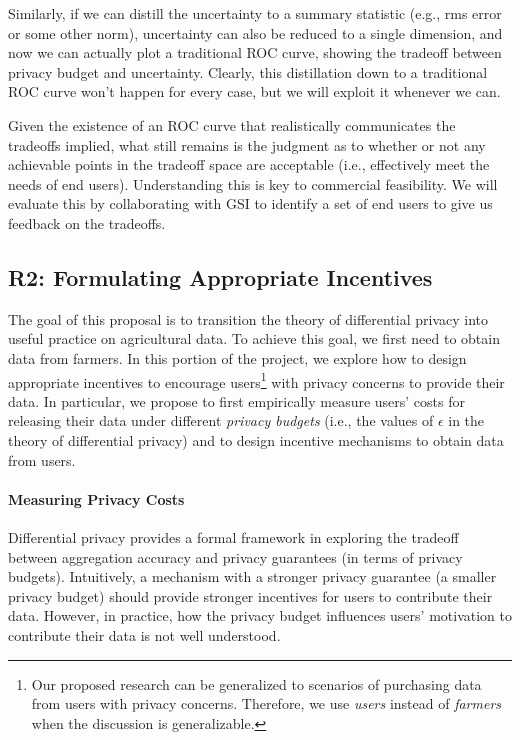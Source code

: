 Similarly, if we can distill the uncertainty to a summary statistic
(e.g., rms error or some other norm), uncertainty can also be reduced
to a single dimension, and now we can actually plot a traditional ROC
curve, showing the tradeoff between privacy budget and uncertainty.
Clearly, this distillation down to a traditional ROC curve won't happen
for every case, but we will exploit it whenever we can.

Given the existence of an ROC curve that realistically communicates the
tradeoffs implied, what still remains is the judgment as to whether or
not any achievable points in the tradeoff space are acceptable (i.e.,
effectively meet the needs of end users).  Understanding
this is key to commercial
feasibility. We will evaluate this by
collaborating with GSI to identify a set of end users
to give us feedback on the tradeoffs.

\subsection{R2: Formulating Appropriate Incentives}
\label{sec:fi}

The goal of this proposal is to transition the theory of differential privacy 
into useful practice on agricultural data. To achieve this goal, we first need
to obtain data from farmers.
In this portion of the project, we explore how to design appropriate 
incentives to encourage users\footnote{Our proposed research can be generalized
to scenarios of purchasing data from users with privacy concerns. Therefore,
we use \emph{users} instead of \emph{farmers} when the discussion is generalizable.}
with privacy concerns to provide their data. 
In particular, we propose to first empirically measure users' costs
for releasing their data under different \emph{privacy budgets} 
(i.e., the values of $\epsilon$ in the theory of differential privacy) 
and to design incentive mechanisms to obtain data from users.%

\paragraph{Measuring Privacy Costs}
Differential privacy provides a formal framework in exploring the tradeoff between 
aggregation accuracy and privacy guarantees (in terms of privacy budgets).
Intuitively, a mechanism with a stronger privacy guarantee 
(a smaller privacy budget) 
should provide stronger incentives for users to contribute their data. 
However, in practice, how the privacy budget influences users' motivation 
to contribute their data is not well understood. 

